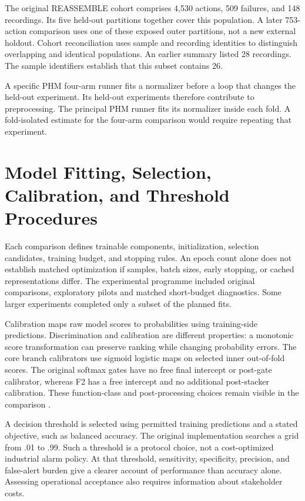 The original REASSEMBLE cohort comprises 4,530 actions, 509 failures, and 148 recordings. Its five held-out partitions together cover this population. A later 753-action comparison uses one of these exposed outer partitions, not a new external holdout. Cohort reconciliation uses sample and recording identities to distinguish overlapping and identical populations. An earlier summary listed 28 recordings. The sample identifiers establish that this subset contains 26.

A specific PHM four-arm runner fits a normalizer before a loop that changes the held-out experiment. Its held-out experiments therefore contribute to preprocessing. The principal PHM runner fits its normalizer inside each fold. A fold-isolated estimate for the four-arm comparison would require repeating that experiment.

\section{Model Fitting, Selection, Calibration, and Threshold Procedures}
Each comparison defines trainable components, initialization, selection candidates, training budget, and stopping rules. An epoch count alone does not establish matched optimization if samples, batch sizes, early stopping, or cached representations differ. The experimental programme included original comparisons, exploratory pilots and matched short-budget diagnostics. Some larger experiments completed only a subset of the planned fits.

Calibration maps raw model scores to probabilities using training-side predictions. Discrimination and calibration are different properties: a monotonic score transformation can preserve ranking while changing probability errors. The core branch calibrators use sigmoid logistic maps on selected inner out-of-fold scores. The original softmax gates have no free final intercept or post-gate calibrator, whereas F2 has a free intercept and no additional post-stacker calibration. These function-class and post-processing choices remain visible in the comparison \citep{Guo2017Calibration}.

A decision threshold is selected using permitted training predictions and a stated objective, such as balanced accuracy. The original implementation searches a grid from .01 to .99. Such a threshold is a protocol choice, not a cost-optimized industrial alarm policy. At that threshold, sensitivity, specificity, precision, and false-alert burden give a clearer account of performance than accuracy alone. Assessing operational acceptance also requires information about stakeholder costs.

